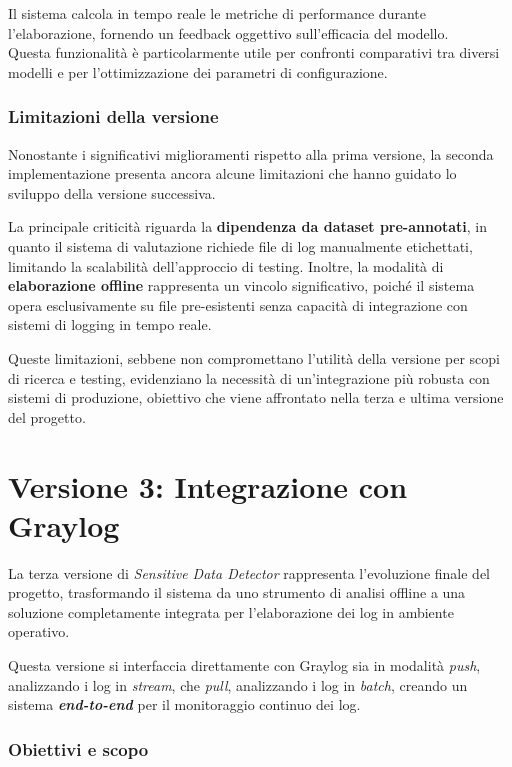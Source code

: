 \documentclass[12pt,twoside]{report}
\begin{document}
Il sistema calcola in tempo reale le metriche di performance durante l'elaborazione, fornendo un feedback oggettivo sull'efficacia del modello.\\
Questa funzionalità è particolarmente utile per confronti comparativi tra diversi modelli e per l'ottimizzazione dei parametri di configurazione.

\subsubsection{Limitazioni della versione}
\label{subsubsec:ver2_limitazioni}

Nonostante i significativi miglioramenti rispetto alla prima versione, la seconda implementazione presenta ancora alcune limitazioni che hanno guidato lo sviluppo della versione successiva.

La principale criticità riguarda la \textbf{dipendenza da dataset pre-annotati}, in quanto il sistema di valutazione richiede file di log manualmente etichettati, limitando la scalabilità dell'approccio di testing. Inoltre, la modalità di \textbf{elaborazione offline} rappresenta un vincolo significativo, poiché il sistema opera esclusivamente su file pre-esistenti senza capacità di integrazione con sistemi di logging in tempo reale.

Queste limitazioni, sebbene non compromettano l'utilità della versione per scopi di ricerca e testing, evidenziano la necessità di un'integrazione più robusta con sistemi di produzione, obiettivo che viene affrontato nella terza e ultima versione del progetto.

\clearpage

\section{Versione 3: Integrazione con Graylog}
\label{sec:ver3}

La terza versione di \textit{Sensitive Data Detector} rappresenta l'evoluzione finale del progetto, trasformando il sistema da uno strumento di analisi offline a una soluzione completamente integrata per l'elaborazione dei log in ambiente operativo.

Questa versione si interfaccia direttamente con Graylog sia in modalità \textit{push}, analizzando i log in \textit{stream}, che \textit{pull}, analizzando i log in \textit{batch}, creando un sistema \textbf{\textit{end-to-end}} per il monitoraggio continuo dei log.

\subsubsection{Obiettivi e scopo}
\label{subsubsec:ver3_obiettivi}
\end{document}
